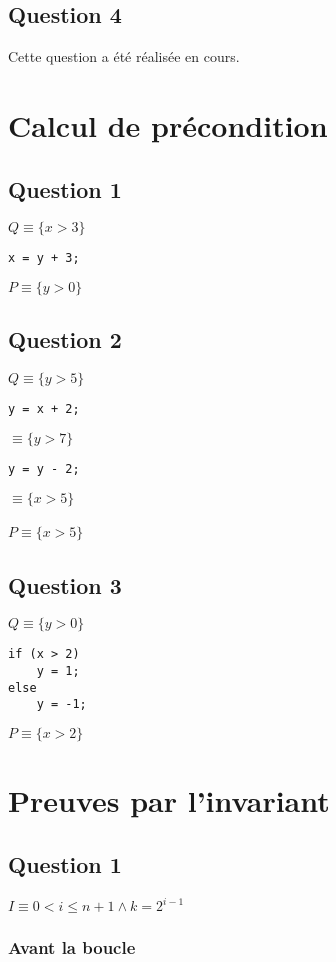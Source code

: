 \documentclass[11pt]{article}
\begin{document}
\subsection{Question 4}
Cette question a été réalisée en cours.

\section{Calcul de précondition}
\subsection{Question 1}
$Q \equiv \{x > 3\}$
\begin{lstlisting}[style=CStyle]
x = y + 3;
\end{lstlisting}

$P \equiv \{y > 0\}$

\subsection{Question 2}
$Q \equiv \{y > 5\}$
\begin{lstlisting}[style=CStyle]
y = x + 2;
\end{lstlisting}

$\equiv \{y > 7\}$
\begin{lstlisting}[style=CStyle]
y = y - 2;
\end{lstlisting}

$\equiv \{x > 5\}$\\\\
$P \equiv \{x > 5\}$

\subsection{Question 3}
$Q \equiv \{y > 0\}$
\begin{lstlisting}[style=CStyle]
if (x > 2)
	y = 1;
else
	y = -1;
\end{lstlisting}
$P \equiv \{x > 2\}$

\section{Preuves par l'invariant}
\subsection{Question 1}
$I \equiv  0 < i \leq n + 1 \land k = 2^{i-1}$

\subsubsection{Avant la boucle}
\end{document}
